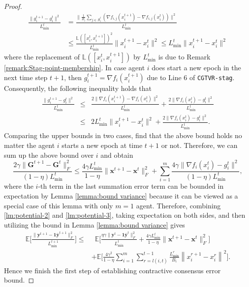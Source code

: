 \documentclass{article}
\newcommand{\cB}{\mathcal{B}}
\newcommand{\bL}{\mathbb{L}}
\newcommand{\git}{g_{i}^t}
\newcommand{\gite}{g_{i}^{t+1}}
\newcommand{\bGt}{\mathbf{G}^t}
\newcommand{\bGte}{\mathbf{G}^{t+1}}
\newcommand{\bxt}{\mathbf{x}^t}
\newcommand{\bxte}{\mathbf{x}^{t+1}}
\newcommand{\byt}{\mathbf{y}^t}
\newcommand{\byte}{\mathbf{y}^{t+1}}
\newcommand{\xit}{x_{i}^{t}}
\newcommand{\xite}{x_{i}^{t+1}}
\newcommand{\bbyt}{\bar{\mathbf{y}}^t}
\newcommand{\bbyte}{\bar{\mathbf{y}}^{t+1}}
\newcommand{\EE}{\mathbb{E}}
\newcommand{\bone}{\mathbf{1}}
\newcommand{\fij}{f_{i,j}}
\begin{document}
\begin{proof}
\begin{align*}
    \frac{\|{g}_i^{t+1}\!-g_i^t\|^2}{L_{\min}^t} &= \frac{\|\frac{1}{B_i}\!\!\sum_{j\in\cB_i^t}\!(\nabla\fij(\xite)-\nabla\fij(\xit)\!)\|^2}{L_{\min}^t} \\
    &\leq \frac{\bL([\xit,\xite])^2}{L_{\min}^t}\|x_i^{t+1}\!-x_i^{t}\|^2\leq L_{\min}^t\|x_i^{t+1}\!-x_i^{t}\|^2 
\end{align*}
where the replacement of $\bL([\xit,\xite])$ by $L_{\min}^t$ is due to Remark \ref{remark:Stag-point-membership}. In case agent $i$ does start a new epoch in the next time step $t+1$, then $g_i^{t+1} = \nabla f_i(x_i^{t+1})$ due to Line 6 of \texttt{CGTVR-stag}. Consequently, the following inequality holds that 
\begin{eqnarray}
\frac{\|\gite-\git\|^2}{L_{\min}^t}  &\leq&  \frac{2\|\nabla f_i(\xite)-\nabla f_i(\xit)\|^2}{L_{\min}^t} 
+ \frac{2\|\nabla f_i(\xit) - \git\|^2}{L_{\min}^t}\nonumber \\
&\leq & 2L_{\min}^t\|\xite\!-\xit\|^2  
+ \frac{2\|\nabla f_i(\xit) - \git\|^2}{L_{\min}^t}.\nonumber
\end{eqnarray}  
Comparing the upper bounds in two cases, find that the above bound holds no matter the agent $i$ starts a new epoch at time $t+1$ or not. Therefore, we can sum up the above bound over $i$ and obtain
\begin{equation}
\label{lm:potential-3}
\frac{2\gamma\|\bGte- \bGt\|_F^2}{(1-\eta)L_{\min}^t} \leq \frac{4\gamma L_{\min}^t}{1-\eta}\|\bxte\!-\bxt\|^2_F  
+ \sum_{i=1}^m\frac{4\gamma\|\nabla f_i(\xit) - \git\|^2}{(1-\eta)L_{\min}^t},
\end{equation}
where the $i$-th term in the last summation error term can be bounded in expectation by Lemma \ref{lemma:bound variance} because it can be viewed as a special case of this lemma with only $m=1$ agent. Therefore, combining \eqref{lm:potential-2} and \eqref{lm:potential-3}, taking expectation on both sides, and then utilizing the bound in Lemma \ref{lemma:bound variance} gives 
\begin{align}
\label{lm:potential-4}
\EE\bigg[\frac{\|\byte - \bone\bbyte\|^2_F}{L_{\min}^{t+1}}\bigg]   \leq & \,\,\,\EE\bigg[\frac{\eta\gamma\|\byt -\bone\bbyt\|_F^2}{L_{\min}^{t}} + \frac{4\gamma L_{\min}^t}{1-\eta}\|\bxte-\bxt\|^2_F\bigg]\\
& + \EE\bigg[\frac{4\gamma^2}{1-\eta}\sum_{i=1}^m \sum_{r=l(i,t)}^{t-1}\frac{L_{\min}^{r}}{B_i}\left\|x_i^{r+1}-x_i^{r}\right\|^2\bigg].\nonumber
\end{align} 
Hence we finish the first step of establishing contractive consensus error bound. \vspace{0.25cm}
 


\end{proof}
\end{document}
